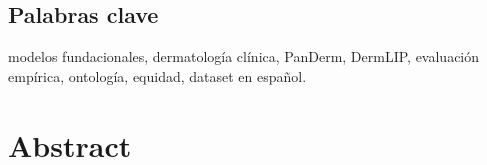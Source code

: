 \vspace*{-0.4cm}
\section*{Palabras clave}
modelos fundacionales, dermatología clínica, PanDerm, DermLIP,
evaluación empírica, ontología, equidad, dataset en español.


\chapter*{Abstract}
\vspace*{0.4cm}


